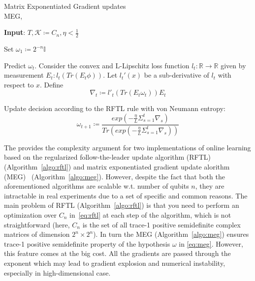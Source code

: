 \documentclass[%
 reprint,
 amsmath,amssymb,
 aps,
]{revtex4-2}
\begin{document}
\begin{algorithm}
\caption{Matrix Exponentiated Gradient updates\\ MEG,~\cite{meg}}
\hspace*{\algorithmicindent} \textbf{Input}: $T,\mathcal{K}\coloneqq C_n,\eta < \frac{1}{2}$ \\
\begin{algorithmic}[1]
\State Set $\omega_1\coloneqq 2^{-n}\mathbb{I}$

    \State  Predict $\omega_t$. Consider the convex and L-Lipschitz loss function $l_t : \mathbb{R} \rightarrow \mathbb{R}$ given by measurement $E_t : l_t(Tr(E_t\phi))$. Let $l_t'(x)$ be a sub-derivative of $l_t$ with respect to $x$. Define
    $$\nabla_t\coloneqq l'_t(Tr(E_t\omega_t))E_t$$

\State Update decision according to the RFTL rule with von Neumann entropy:
\begin{equation}
\label{eq:meg}
\omega_{t+1}\coloneqq\frac{exp(-\frac{\eta}{L}\Sigma_{s=1}^t\nabla_s)}{Tr(exp(-\frac{\eta}{L}\Sigma_{s=1}^t\nabla_s))}    
\end{equation}

\EndFor

\end{algorithmic}
\label{algo:meg}
\end{algorithm}

The \cite{Aaronson_2019} provides the complexity argument for two implementations of online learning based on the regularized follow-the-leader update algorithm (RFTL)~\cite{rftl} (Algorithm~\ref{algo:rftl}) and matrix exponentiated gradient update alorithm (MEG)~\cite{meg} (Algorithm~\ref{algo:meg}). However, despite the fact that both the aforementioned algorithms are scalable w.t. number of qubits $n$, they are intractable in real experiments due to a set of specific and common reasons. The main problem of RFTL (Algorithm~\ref{algo:rftl}) is that you need to perform an optimization over $C_n$ in~\eqref{eq:rftl} at each step of the algorithm, which is not straightforward (here, $C_n$ is the set of all trace-1 positive semidefinite complex matrices of dimension $2^{n}\times2^{n}$). In turn the MEG (Algorithm~\ref{algo:meg}) ensures trace-1 positive semidefinite property of the hypothesis $\omega$ in \eqref{eq:meg}. However, this feature comes at the big cost. All the gradients are passed through the exponent which may lead to gradient explosion and numerical instability, especially in high-dimensional case.
\end{document}
